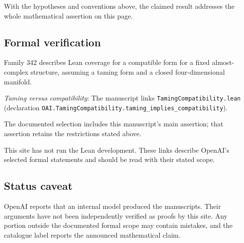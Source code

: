 \documentclass[11pt]{article}
\begin{document}
With the hypotheses and conventions above, the claimed result addresses the whole mathematical assertion on this page.

\subsection{Formal verification}
Family 342 describes Lean coverage for a compatible form for a fixed almost-complex structure, assuming a taming form and a closed four-dimensional manifold.

\textit{Taming versus compatibility}: The manuscript links \texttt{TamingCompatibility.lean} (declaration \texttt{OAI.TamingCompatibility.taming\_implies\_compatibility}).

The documented selection includes this manuscript’s main assertion; that assertion retains the restrictions stated above.

This site has not run the Lean development. These links describe OpenAI’s selected formal statements and should be read with their stated scope.

\subsection{Status caveat}
OpenAI reports that an internal model produced the manuscripts. Their arguments have not been independently verified as proofs by this site. Any portion outside the documented formal scope may contain mistakes, and the catalogue label reports the announced mathematical claim.
\end{document}
